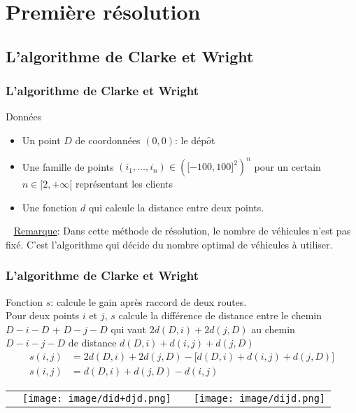 \documentclass[10pt]{beamer}
\begin{document}
	\section{Première résolution}

	\subsection{L'algorithme de Clarke et Wright}

	\begin{frame}
		\frametitle{L'algorithme de Clarke et Wright}
		\begin{beamerboxesrounded}[upper=data_up,lower=data_low,shadow=true]{Données}
			\begin{itemize}[label=-]
				\item Un point \(D\) de coordonnées \((0,0)\): le dép\(\hat{o} \)t
				\pause%
				\item Une famille de points \((i_1,\ldots ,i_n) \in {(\lbrack-100,100\rbrack^2)}^n\) pour un certain \(n \in \lbrack2,+\infty\lbrack \) représentant les clients
				\pause%
				\item Une fonction \(d\) qui calcule la distance entre deux points.
				\pause%
			\end{itemize}
		\end{beamerboxesrounded}\ \newline
		\underline{Remarque}: Dans cette méthode de résolution, le nombre de véhicules n'est pas fixé. C'est l'algorithme qui décide du nombre optimal de véhicules à utiliser. 
	\end{frame}

	\begin{frame}
		\frametitle{L'algorithme de Clarke et Wright}
		\begin{definition}
			Fonction \(s \): calcule le gain après raccord de deux routes. \\Pour deux points \(i\) et \(j\), \(s\) calcule la différence de distance entre le chemin \\ \(D- i - D \) + \(D-j-D \) qui vaut \(2d(D,i) + 2d(j,D)\) au chemin\\ \(D-i-j-D \) de distance \(d(D,i) + d(i,j) + d(j,D)\)
		\begin{align*}
			s(i,j) &= 2d(D,i) + 2d(j,D) - \lbrack d(D,i) + d(i,j) + d(j,D)\rbrack \\
			s(i,j) &= d(D,i) + d(j,D) - d(i,j)
		\end{align*}
		\end{definition}
		\pause%
		\begin{tabular}{cccc}
			\; \; \; \;
			&
			\texttt{[image: image/did+djd.png]}
			&
			\; \; \; \;
			\pause%
			&
			\texttt{[image: image/dijd.png]}			
		\end{tabular}
	\end{frame}
\end{document}

